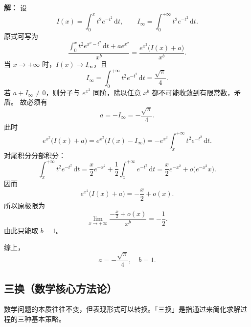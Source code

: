 \documentclass[../book.tex]{subfiles}
\begin{document}
\begin{enumerate}
\begin{analysisbox}
            \textbf{解：}
            设
            \[
                I(x)=\int_0^x t^2e^{-t^2}\,\mathrm{d}t,\qquad I_\infty=\int_0^{+\infty} t^2e^{-t^2}\,\mathrm{d}t.
            \]
            原式可写为
            \[
                \frac{\int_0^x t^2e^{x^2-t^2}\,\mathrm{d}t+ae^{x^2}}{x^b}
                =\frac{e^{x^2}\bigl(I(x)+a\bigr)}{x^b}.
            \]
            当 $x\to+\infty$ 时，$I(x)\to I_\infty$，且
            \[
                I_\infty=\int_0^{+\infty} t^2e^{-t^2}\,\mathrm{d}t
                =\frac{\sqrt{\pi}}{4}.
            \]
            若 $a+I_\infty\neq0$，则分子与 $e^{x^2}$ 同阶，除以任意 $x^b$ 都不可能收敛到有限常数，矛盾。
            故必须有
            \[
                a=-I_\infty=-\frac{\sqrt{\pi}}{4}.
            \]
            此时
            \[
                e^{x^2}\bigl(I(x)+a\bigr)
                =e^{x^2}\bigl(I(x)-I_\infty\bigr)
                =-e^{x^2}\int_x^{+\infty} t^2e^{-t^2}\,\mathrm{d}t.
            \]
            对尾积分分部积分：
            \[
                \int_x^{+\infty} t^2e^{-t^2}\,\mathrm{d}t
                =\frac{x}{2}e^{-x^2}+\frac12\int_x^{+\infty}e^{-t^2}\,\mathrm{d}t
                =\frac{x}{2}e^{-x^2}+o\!\bigl(e^{-x^2}x\bigr).
            \]
            因而
            \[
                e^{x^2}\bigl(I(x)+a\bigr)
                =-\frac{x}{2}+o(x).
            \]
            所以原极限为
            \[
                \lim_{x\to+\infty}\frac{-\frac{x}{2}+o(x)}{x^b}=-\frac12.
            \]
            由此只能取 $b=1$。

            综上，
            \[
                \boxed{a=-\frac{\sqrt{\pi}}{4},\quad b=1.}
            \]
        \end{analysisbox}
    \end{enumerate}

    \subsection{三换（数学核心方法论）}
    数学问题的本质往往不变，但表现形式可以转换。「三换」是指通过{\color{red}{改变问题的表达形式}}来简化求解过程的三种基本策略。
\end{document}
